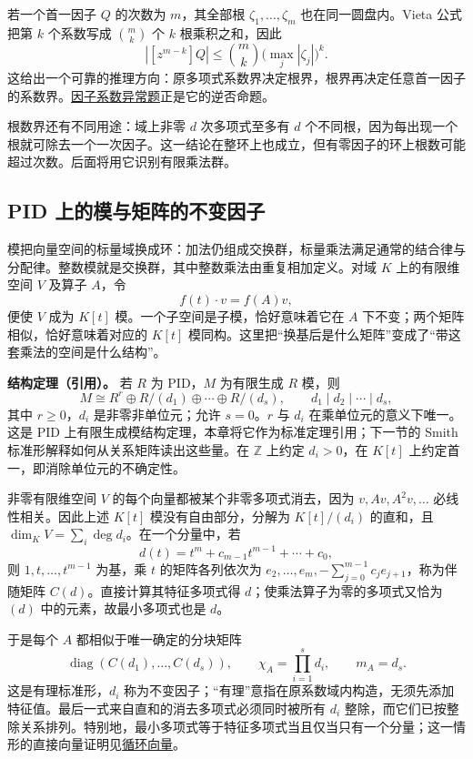 \documentclass[UTF8,12pt,a4paper,fontset=fandol]{ctexart}
\begin{document}
若一个首一因子 $Q$ 的次数为 $m$，其全部根 $\zeta_1,\ldots,\zeta_m$ 也在同一圆盘内。Vieta 公式把第 $k$ 个系数写成 $\binom mk$ 个 $k$ 根乘积之和，因此
\[
|[z^{m-k}]Q|\le\binom mk\bigl(\max_j|\zeta_j|\bigr)^k.
\]
这给出一个可靠的推理方向：原多项式系数界决定根界，根界再决定任意首一因子的系数界。\hyperref[pr:fin16-high:6]{因子系数异常题}正是它的逆否命题。

根数界还有不同用途：域上非零 $d$ 次多项式至多有 $d$ 个不同根，因为每出现一个根就可除去一个一次因子。这一结论在整环上也成立，但有零因子的环上根数可能超过次数。后面将用它识别有限乘法群。

\subsection{PID 上的模与矩阵的不变因子}

\label{app:algebra-modules}

模把向量空间的标量域换成环：加法仍组成交换群，标量乘法满足通常的结合律与分配律。整数模就是交换群，其中整数乘法由重复相加定义。对域 $K$ 上的有限维空间 $V$ 及算子 $A$，令
\[
f(t)\cdot v=f(A)v,
\]
便使 $V$ 成为 $K[t]$ 模。一个子空间是子模，恰好意味着它在 $A$ 下不变；两个矩阵相似，恰好意味着对应的 $K[t]$ 模同构。这里把“换基后是什么矩阵”变成了“带这套乘法的空间是什么结构”。

\textbf{结构定理（引用）。} 若 $R$ 为 PID，$M$ 为有限生成 $R$ 模，则
\[
M\cong R^r\oplus R/(d_1)\oplus\cdots\oplus R/(d_s),
\qquad d_1\mid d_2\mid\cdots\mid d_s,
\]
其中 $r\ge0$，$d_i$ 是非零非单位元；允许 $s=0$。$r$ 与 $d_i$ 在乘单位元的意义下唯一。这是 PID 上有限生成模结构定理，本章将它作为标准定理引用；下一节的 Smith 标准形解释如何从关系矩阵读出这些量。在 $\mathbb Z$ 上约定 $d_i>0$，在 $K[t]$ 上约定首一，即消除单位元的不确定性。

非零有限维空间 $V$ 的每个向量都被某个非零多项式消去，因为 $v,Av,A^2v,\ldots$ 必线性相关。因此上述 $K[t]$ 模没有自由部分，分解为 $K[t]/(d_i)$ 的直和，且 $\dim_K V=\sum_i\deg d_i$。在一个分量中，若
\[
d(t)=t^m+c_{m-1}t^{m-1}+\cdots+c_0,
\]
则 $1,t,\ldots,t^{m-1}$ 为基，乘 $t$ 的矩阵各列依次为 $e_2,\ldots,e_m,-\sum_{j=0}^{m-1}c_je_{j+1}$，称为伴随矩阵 $C(d)$。直接计算其特征多项式得 $d$；使乘法算子为零的多项式又恰为 $(d)$ 中的元素，故最小多项式也是 $d$。

于是每个 $A$ 都相似于唯一确定的分块矩阵
\[
\operatorname{diag}(C(d_1),\ldots,C(d_s)),
\qquad
\chi_A=\prod_{i=1}^s d_i,\qquad m_A=d_s.
\]
这是有理标准形，$d_i$ 称为不变因子；“有理”意指在原系数域内构造，无须先添加特征值。最后一式来自直和的消去多项式必须同时被所有 $d_i$ 整除，而它们已按整除关系排列。特别地，最小多项式等于特征多项式当且仅当只有一个分量；这一情形的直接向量证明见\hyperref[app:linear-cyclic]{循环向量}。
\end{document}
